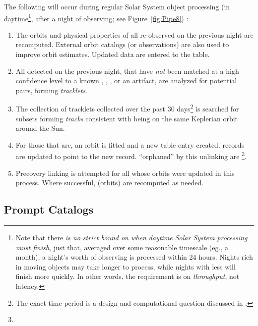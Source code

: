\documentclass[SE,lsstdraft,toc]{lsstdoc}
\begin{document}
The following will occur during regular Solar System object processing (in daytime\footnote{Note that there \emph{is no strict bound on when daytime Solar System processing must finish}, just that, averaged over some reasonable timescale (eg., a month), a night's worth of observing is processed within 24 hours. Nights rich in moving objects may take longer to process, while nights with less will finish more quickly. In other words, the requirement is on \emph{throughput}, not latency.}, after a night of observing; see Figure~\ref{fig:Pipe8}) :
\begin{enumerate}
\item The orbits and physical properties of all \SSObjects re-observed on the previous night are recomputed. External orbit catalogs (or observations) are also used to improve orbit estimates. Updated data are entered to the \SSObjects table.
\item All \DIASources detected on the previous night, that have \emph{not} been matched at a high confidence level to a known \Object,
\DIAObject, \SSObject, or an artifact, are analyzed for potential pairs, forming \emph{tracklets}.
\item The collection of tracklets collected over the past 30 days\footnote{The exact time period is a design and computational question discussed in .} is searched for subsets forming \emph{tracks} consistent with being on the same Keplerian orbit around the Sun.
\item For those that are, an orbit is fitted and a new \SSObject table entry created. \DIASource records are updated to point to the new \SSObject record. \DIAObjects ``orphaned'' by this unlinking are  \footnote{}.
\item Precovery linking is attempted for all \SSObjects whose orbits were updated in this process. Where successful, \SSObjects (orbits) are recomputed as needed.
\end{enumerate}

\subsection{Prompt Catalogs}
\label{sec:level1db}
\end{document}
